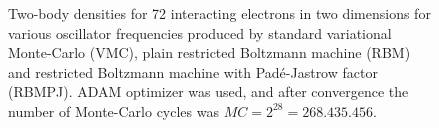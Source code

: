 \begin{landscape}
\begin{figure} [H]
		
		\caption{Two-body densities for 72 interacting electrons in two dimensions for various oscillator frequencies produced by standard variational Monte-Carlo (VMC), plain restricted Boltzmann machine (RBM) and restricted Boltzmann machine with Padé-Jastrow factor (RBMPJ). ADAM optimizer was used, and after convergence the number of Monte-Carlo cycles was $MC=2^{28}=268.435.456$.}%
		\label{fig:TB_interaction_3D_2}
	\end{figure}
\end{landscape}

